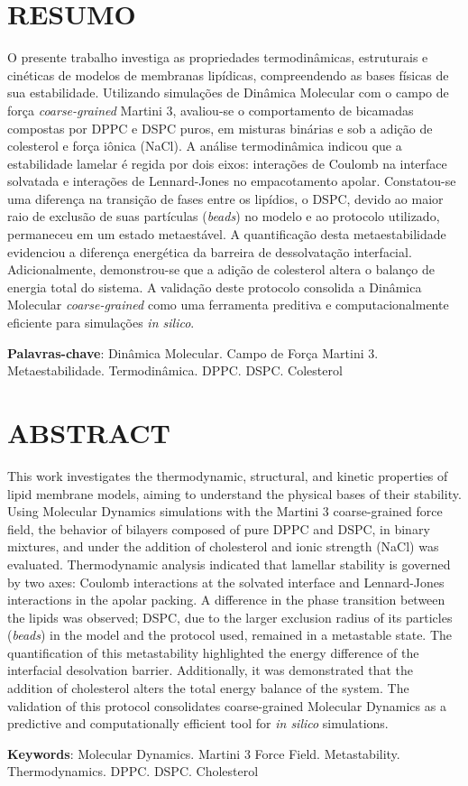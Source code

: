 \section*{RESUMO}

O presente trabalho investiga as propriedades termodinâmicas, estruturais e cinéticas de modelos de membranas lipídicas, compreendendo as bases físicas de sua estabilidade. Utilizando simulações de Dinâmica Molecular com o campo de força \textit{coarse-grained} Martini 3, avaliou-se o comportamento de bicamadas compostas por DPPC e DSPC puros, em misturas binárias e sob a adição de colesterol e força iônica (NaCl). A análise termodinâmica indicou que a estabilidade lamelar é regida por dois eixos: interações de Coulomb na interface solvatada e interações de Lennard-Jones no empacotamento apolar. Constatou-se uma diferença na transição de fases entre os lipídios, o DSPC, devido ao maior raio de exclusão de suas partículas (\textit{beads}) no modelo e ao protocolo utilizado, permaneceu em um estado metaestável. A quantificação desta metaestabilidade evidenciou a diferença energética da barreira de dessolvatação interfacial. Adicionalmente, demonstrou-se que a adição de colesterol altera o balanço de energia total do sistema. A validação deste protocolo consolida a Dinâmica Molecular \textit{coarse-grained} como uma ferramenta preditiva e computacionalmente eficiente para simulações \textit{in silico}.



\vspace{\baselineskip}
\noindent
\textbf{Palavras-chave}: Dinâmica Molecular. Campo de Força Martini 3. Metaestabilidade. Termodinâmica. DPPC. DSPC. Colesterol 


\section*{ABSTRACT}
This work investigates the thermodynamic, structural, and kinetic properties of lipid membrane models, aiming to understand the physical bases of their stability. Using Molecular Dynamics simulations with the Martini 3 coarse-grained force field, the behavior of bilayers composed of pure DPPC and DSPC, in binary mixtures, and under the addition of cholesterol and ionic strength (NaCl) was evaluated. Thermodynamic analysis indicated that lamellar stability is governed by two axes: Coulomb interactions at the solvated interface and Lennard-Jones interactions in the apolar packing. A difference in the phase transition between the lipids was observed; DSPC, due to the larger exclusion radius of its particles (\textit{beads}) in the model and the protocol used, remained in a metastable state. The quantification of this metastability highlighted the energy difference of the interfacial desolvation barrier. Additionally, it was demonstrated that the addition of cholesterol alters the total energy balance of the system. The validation of this protocol consolidates coarse-grained Molecular Dynamics as a predictive and computationally efficient tool for \textit{in silico} simulations.

\vspace{\baselineskip}
\noindent
\textbf{Keywords}: Molecular Dynamics. Martini 3 Force Field. Metastability. Thermodynamics. DPPC. DSPC. Cholesterol
